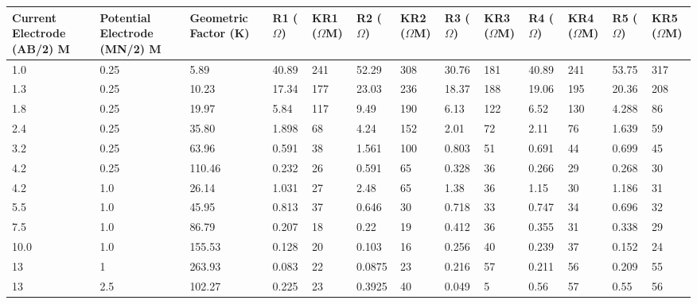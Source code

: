 \documentclass[12pt,a4paper]{report}
\begin{document}
\begin{itemize}
    \begin{table}[H]
        \centering
        \begin{adjustbox}{max width=\textwidth}
        \renewcommand{\arraystretch}{1.5}
        \begin{tabular}{|p{2.5cm}|p{2.5cm}|p{2.5cm}|p{1.5cm}|p{1.8cm}|p{1.5cm}|p{1.8cm}|p{1.5cm}|p{1.8cm}|p{1.5cm}|p{1.8cm}|p{1.5cm}|p{1.8cm}|}
        \hline
        \textbf{Current Electrode (AB/2) M} & 
        \textbf{Potential Electrode (MN/2) M} & 
        \textbf{Geometric Factor (K)} & 
        \textbf{R1 ($\Omega$)} & 
        \textbf{KR1 ($\Omega$M)} & 
        \textbf{R2 ($\Omega$)} & 
        \textbf{KR2 ($\Omega$M)} & 
        \textbf{R3 ($\Omega$)} & 
        \textbf{KR3 ($\Omega$M)} & 
        \textbf{R4 ($\Omega$)} & 
        \textbf{KR4 ($\Omega$M)} & 
        \textbf{R5 ($\Omega$)} & 
        \textbf{KR5 ($\Omega$M)} \\ 
        \hline
        1.0 & 0.25 & 5.89 & 40.89 & 241 & 52.29 & 308 & 30.76 & 181 & 40.89 & 241 & 53.75 & 317 \\ \hline
        1.3 & 0.25 & 10.23 & 17.34 & 177 & 23.03 & 236 & 18.37 & 188 & 19.06 & 195 & 20.36 & 208 \\ \hline
        1.8 & 0.25 & 19.97 & 5.84 & 117 & 9.49 & 190 & 6.13 & 122 & 6.52 & 130 & 4.288 & 86 \\ \hline
        2.4 & 0.25 & 35.80 & 1.898 & 68 & 4.24 & 152 & 2.01 & 72 & 2.11 & 76 & 1.639 & 59 \\ \hline
        3.2 & 0.25 & 63.96 & 0.591 & 38 & 1.561 & 100 & 0.803 & 51 & 0.691 & 44 & 0.699 & 45 \\ \hline
        4.2 & 0.25 & 110.46 & 0.232 & 26 & 0.591 & 65 & 0.328 & 36 & 0.266 & 29 & 0.268 & 30 \\ \hline
        4.2 & 1.0 & 26.14 & 1.031 & 27 & 2.48 & 65 & 1.38 & 36 & 1.15 & 30 & 1.186 & 31 \\ \hline
        5.5 & 1.0 & 45.95 & 0.813 & 37 & 0.646 & 30 & 0.718 & 33 & 0.747 & 34 & 0.696 & 32 \\ \hline
        7.5 & 1.0 & 86.79 & 0.207 & 18 & 0.22 & 19 & 0.412 & 36 & 0.355 & 31 & 0.338 & 29 \\ \hline
        10.0 & 1.0 & 155.53 & 0.128 & 20 & 0.103 & 16 & 0.256 & 40 & 0.239 & 37 & 0.152 & 24 \\ \hline
        13 & 1 & 263.93 & 0.083 & 22 & 0.0875 & 23 & 0.216 & 57 & 0.211 & 56 & 0.209 & 55 \\ \hline
        13 & 2.5 & 102.27 & 0.225 & 23 & 0.3925 & 40 & 0.049 & 5 & 0.56 & 57 & 0.55 & 56 \\ \hline

\end{tabular}
\end{adjustbox}
\end{table}
\end{itemize}
\end{document}
